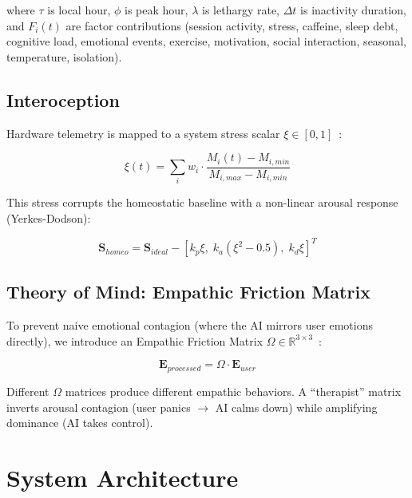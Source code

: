 \documentclass[journal,twoside]{IEEEtran}
\begin{document}
where $\tau$ is local hour, $\phi$ is peak hour, $\lambda$ is lethargy rate, $\Delta t$ is inactivity duration, and $F_i(t)$ are factor contributions (session activity, stress, caffeine, sleep debt, cognitive load, emotional events, exercise, motivation, social interaction, seasonal, temperature, isolation).

\subsection{Interoception}

Hardware telemetry is mapped to a system stress scalar $\xi \in [0, 1]$~\cite{craig2002, garfinkel2020}:

\begin{equation}
\xi(t) = \sum_{i} w_i \cdot \frac{M_i(t) - M_{i,min}}{M_{i,max} - M_{i,min}}
\label{eq:interoception}
\end{equation}

This stress corrupts the homeostatic baseline with a non-linear arousal response (Yerkes-Dodson):

\begin{equation}
\mathbf{S}_{homeo} = \mathbf{S}_{ideal} - [k_p \xi, \; k_a(\xi^2 - 0.5), \; k_d \xi]^T
\label{eq:homeo_corrupt}
\end{equation}

\subsection{Theory of Mind: Empathic Friction Matrix}

To prevent naive emotional contagion (where the AI mirrors user emotions directly), we introduce an Empathic Friction Matrix $\Omega \in \mathbb{R}^{3 \times 3}$~\cite{premack1978, hatfield1993}:

\begin{equation}
\mathbf{E}_{processed} = \Omega \cdot \mathbf{E}_{user}
\label{eq:tom}
\end{equation}

Different $\Omega$ matrices produce different empathic behaviors. A ``therapist'' matrix inverts arousal contagion (user panics $\rightarrow$ AI calms down) while amplifying dominance (AI takes control).

\section{System Architecture}
\end{document}
